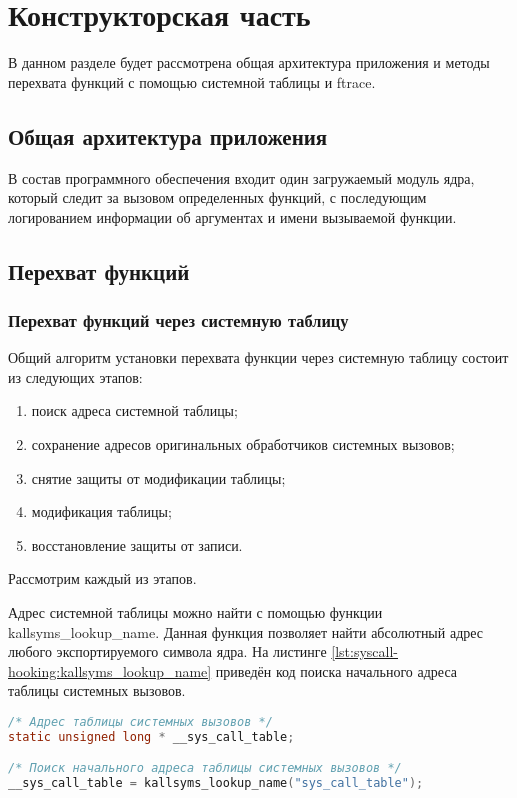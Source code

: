 \chapter{Конструкторская часть}
    В данном разделе будет рассмотрена общая архитектура приложения и 
    методы перехвата функций с помощью системной таблицы и ftrace.

\section{Общая архитектура приложения}
    В состав программного обеспечения входит один загружаемый модуль ядра, 
    который следит за вызовом определенных функций, 
    с последующим логированием информации 
    об аргументах и имени вызываемой функции.

\section{Перехват функций}
    \subsection{Перехват функций через системную таблицу}
        Общий алгоритм установки перехвата функции через системную таблицу 
        состоит из следующих этапов:
        \begin{enumerate}
            \item поиск адреса системной таблицы;
            \item сохранение адресов оригинальных обработчиков системных вызовов;
            \item снятие защиты от модификации таблицы;
            \item модификация таблицы;
            \item восстановление защиты от записи.
        \end{enumerate}
        
        Рассмотрим каждый из этапов.

        Адрес системной таблицы можно найти с помощью функции kallsyms\_lookup\_name.
        Данная функция позволяет найти абсолютный адрес любого экспортируемого символа ядра.
        На листинге \ref{lst:syscall-hooking:kallsyms_lookup_name} приведён
        код поиска начального адреса таблицы системных вызовов.
    \begin{lstlisting}[language=C, label=lst:syscall-hooking:kallsyms_lookup_name, caption=Поиск начального адреса таблицы системных вызовов]
/* Адрес таблицы системных вызовов */
static unsigned long * __sys_call_table;

/* Поиск начального адреса таблицы системных вызовов */
__sys_call_table = kallsyms_lookup_name("sys_call_table");
    \end{lstlisting}

